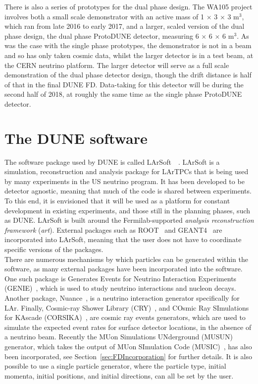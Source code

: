 There is also a series of prototypes for the dual phase design. The WA105 project involves both a small scale demonstrator with an active mass of 1 $\times$ 3 $\times$ 3 m$^3$, which ran from late 2016 to early 2017, and a larger, scaled version of the dual phase design, the dual phase ProtoDUNE detector, measuring 6 $\times$ 6 $\times$ 6 m$^3$. As was the case with the single phase prototypes, the demonstrator is not in a beam and so has only taken cosmic data, whilst the larger detector is in a test beam, at the CERN neutrino platform. The larger detector will serve as a full scale demonstration of the dual phase detector design, though the drift distance is half of that in the final DUNE FD. Data-taking for this detector will be during the second half of 2018, at roughly the same time as the single phase ProtoDUNE detector. \\

\section{The DUNE software} \label{sec:LArSoft} %
The software package used by DUNE is called LArSoft~\citep{Church_LArSoft}~\citep{LArSoftOrg}. LArSoft is a simulation, reconstruction and analysis package for LArTPCs that is being used by many experiments in the US neutrino program. It has been developed to be detector agnostic, meaning that much of the code is shared between experiments. To this end, it is envisioned that it will be used as a platform for constant development in existing experiments, and those still in the planning phases, such as DUNE. LArSoft is built around the Fermilab-supported \emph{analysis reconstruction framework} (\emph{art}). External packages such as ROOT~\citep{ROOT} and GEANT4~\citep{GEANT4} are incorporated into LArSoft, meaning that the user does not have to coordinate specific versions of the packages. \\

There are numerous mechanisms by which particles can be generated within the software, as many external packages have been incorporated into the software. One such package is Generates Events for Neutrino Interaction Experiments (GENIE)~\citep{GENIE}, which is used to study neutrino interactions and nucleon decays. Another package, Nuance~\citep{Nuance}, is a neutrino interaction generator specifically for LAr. Finally, Cosmic-ray Shower Library (CRY)~\citep{CRY,CRY2}, and COsmic Ray SImulations for KAscade (CORSIKA)~\citep{CORSIKA}, are cosmic ray events generators, which are used to simulate the expected event rates for surface detector locations, in the absence of a neutrino beam. Recently the MUon Simulations UNderground (MUSUN)~\citep{MUSUN, MUSUN2} generator, which takes the output of MUon SImulation Code (MUSIC)~\citep{MUSUN, MUSIC, MUSIC2}, has also been incorporated, see Section~\ref{sec:FDIncorporation} for further details. It is also possible to use a single particle generator, where the particle type, initial momenta, initial positions, and initial directions, can all be set by the user. \\

